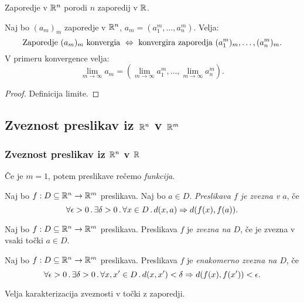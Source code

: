 \begin{opomba}
    Zaporedje v $\mathbb{R}^n$ porodi $n$ zaporedij v $\mathbb{R}$.
\end{opomba}

\begin{trditev}
    Naj bo $(a_m)_m$ zaporedje v $\mathbb{R}^n$, $a_m = (a_1^m, \ldots, a_n^m)$. Velja:
    $$\text{Zaporedje } (a_m)_m \text{ konvergia } \Leftrightarrow \text{ konvergira zaporedja } (a_1^m)_m, \ldots, (a_n^m)_m.$$
    V primeru konvergence velja:
    $$\lim_{m \to \infty} a_m = (\lim_{m \to \infty} a_1^m, \ldots, \lim_{m \to \infty} a_n^m).$$
\end{trditev}

\begin{proof}
    Definicija limite.
\end{proof}

\subsection{Zveznost preslikav iz $\mathbb{R}^n$ v $\mathbb{R}^m$}
\subsubsection{Zveznost preslikav iz $\mathbb{R}^n$ v $\mathbb{R}$}
\begin{opomba}
    Če je $m=1$, potem preslikave rečemo \emph{funkcija}.
\end{opomba}

\begin{definicija}
    Naj bo $f: D \subseteq \mathbb{R}^n \to \mathbb{R}^m$ preslikava. Naj bo $a \in D$. \emph{Preslikava $f$ je zvezna v $a$}, če 
    $$\forall \epsilon > 0 \,.\, \exists \delta >0 \,.\, \forall x \in D \,.\, d(x, a) \Rightarrow d(f(x), f(a)).$$
\end{definicija}

\begin{definicija}
    Naj bo $f: D \subseteq \mathbb{R}^n \to \mathbb{R}^m$ preslikava. Preslikava $f$ je \emph{zvezna na $D$}, če je zvezna v vsaki točki $a \in D$.
\end{definicija}

\begin{definicija}
    Naj bo $f: D \subseteq \mathbb{R}^n \to \mathbb{R}^m$ preslikava. Preslikava $f$ je \emph{enakomerno zvezna na $D$}, če
    $$\forall \epsilon > 0 \,.\, \exists \delta > 0 \,.\, \forall x, x' \in D \,.\, d(x, x') < \delta \Rightarrow d(f(x), f(x')) < \epsilon.$$
\end{definicija}

\begin{opomba}
    Velja karakterizacija zveznosti v točki z zaporedji.
\end{opomba}

